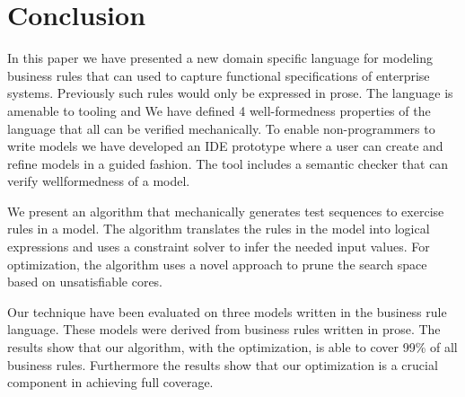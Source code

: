 \section{Conclusion}

In this paper we have presented a new domain specific language for
modeling business rules that can used to capture functional
specifications of enterprise systems. Previously such rules would only
be expressed in prose. The language is amenable to tooling and We have
defined 4 well-formedness properties of the language that all can be
verified mechanically. To enable non-programmers to write models we
have developed an IDE prototype where a user can create and refine
models in a guided fashion. The tool includes a semantic checker that
can verify wellformedness of a model.

We present an algorithm that mechanically generates test sequences to
exercise rules in a model. The algorithm translates the rules in the
model into logical expressions and uses a constraint solver to infer
the needed input values. For optimization, the algorithm uses a novel
approach to prune the search space based on unsatisfiable cores. 

Our technique have been evaluated on three models written in the
business rule language. These models were derived from business rules
written in prose. The results show that our algorithm, with the
optimization, is able to cover 99\% of all business rules. Furthermore
the results show that our optimization is a crucial component in
achieving full coverage.

